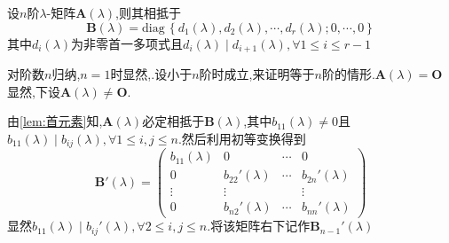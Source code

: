 \begin{formal}
\begin{theorem}[相抵]\label{thm:相抵}
    设$n$阶$\lambda$-矩阵$\bm{A}\left(\lambda\right)$,则其相抵于
    \[
\bm{B}\left(\lambda\right)=\mathrm{diag}\,\left\{
    d_1\left(\lambda\right),d_2\left(\lambda\right),\cdots,d_r\left(\lambda\right);0,\cdots,0
\right\}
    \]其中$d_i\left(\lambda\right)$为非零首一多项式且$d_i\left(\lambda\right)\mid d_{i+1}\left(\lambda\right),\forall 1\leqslant i\leqslant r-1$
\end{theorem}
\begin{Proof}
对阶数$n$归纳,$n=1$时显然,.设小于$n$阶时成立,来证明等于$n$阶的情形.$\bm{A}\left(\lambda\right)=\bm{O}$显然,下设$\bm{A}\left(\lambda\right)\neq \bm{O}$.

由\cref{lem:首元素}知,$\bm{A}\left(\lambda\right)$必定相抵于$\bm{B}\left(\lambda\right)$,其中$b_{11}\left(\lambda\right)\neq 0$且$b_{11}\left(\lambda\right)\mid b_{ij}\left(\lambda\right),\forall 1\leqslant i,j\leqslant n.$然后利用初等变换得到
\[
\bm{B}'\left(\lambda\right)=\begin{pmatrix}
    b_{11}\left(\lambda\right)&0&\cdots&0\\
    0&b_{22}'\left(\lambda\right)&\cdots&b_{2n}'\left(\lambda\right)\\
    \vdots&\vdots&&\vdots\\
    0&b_{n2}'\left(\lambda\right)&\cdots&b_{nn}'\left(\lambda\right)
\end{pmatrix}
\]显然$b_{11}\left(\lambda\right)\mid b_{ij}'\left(\lambda\right),\forall 2\leqslant i,j\leqslant n.$将该矩阵右下记作$\bm{B}_{n-1}'\left(\lambda\right)$


\end{Proof}
\end{formal}
